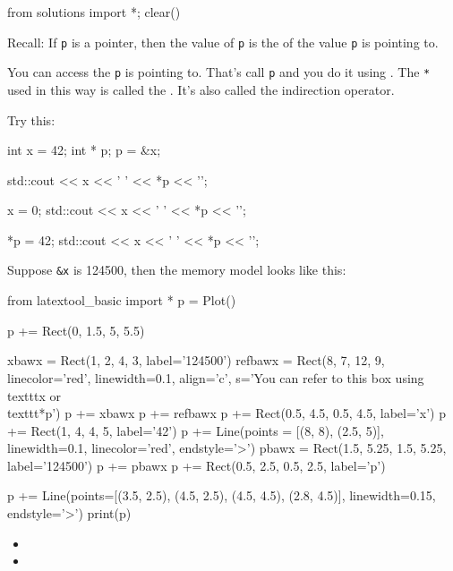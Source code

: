 \begin{python0}
from solutions import *; clear()
\end{python0}

Recall: If \texttt{p} is a pointer, then the value of \texttt{p} is the  of the value \texttt{p} is pointing to.

You can access the  \texttt{p} is pointing to. That's call  \texttt{p} and you do it using . The \texttt{*} used in this way is called the . It's also called the indirection operator.

Try this:

\begin{consolethree}[escapeinside=||]
int x = 42;
int * p;
p = \&x;

std::cout << x << ' ' << *p << '\n';

x = 0;
std::cout << x << ' ' << *p << '\n';

*p = 42;
std::cout << x << ' ' << *p << '\n';
\end{consolethree}
Suppose \texttt{\&x} is 124500, then the memory model looks like this:

\begin{python}
from latextool_basic import *
p = Plot()

p += Rect(0, 1.5, 5, 5.5)

xbawx = Rect(1, 2, 4, 3, label='124500')
refbawx = Rect(8, 7, 12, 9, linecolor='red', linewidth=0.1, align='c', s='You can refer to this box using \\texttt{x} or \\texttt{*p}')
p += xbawx
p += refbawx
p += Rect(0.5, 4.5, 0.5, 4.5, label='x')
p += Rect(1, 4, 4, 5, label='42')
p += Line(points = [(8, 8), (2.5, 5)], linewidth=0.1, linecolor='red', endstyle='>')
pbawx = Rect(1.5, 5.25, 1.5, 5.25, label='124500')
p += pbawx
p += Rect(0.5, 2.5, 0.5, 2.5, label='p')

p += Line(points=[(3.5, 2.5), (4.5, 2.5), (4.5, 4.5), (2.8, 4.5)], linewidth=0.15, endstyle='>')
print(p)
\end{python}



\begin{itemize}
\item
\item
\end{itemize}

